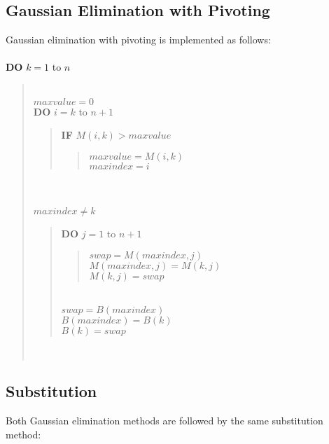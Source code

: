 \documentclass[10pt]{article}
\begin{document}
\subsection{Gaussian Elimination with Pivoting}
\noindent Gaussian elimination with pivoting is implemented as follows: \\ \\
{\bf{DO}} $k = 1$ to $n$
\begin{quote}
 \\
\noindent $maxvalue = 0$ \\
{\bf{DO}} $i = k$ to $n+1$
\begin{quote}
{\bf{IF}} $M\left(i,k\right) > maxvalue$
\begin{quote}
\noindent $maxvalue = M\left(i,k\right)$ \\
\noindent $maxindex = i$
\end{quote}
\end{quote}
 \\
 \\
 $maxindex \ne k$
\begin{quote}
{\bf{DO}} $j = 1$ to $n+1$
\begin{quote}
\noindent $swap = M\left(maxindex,j\right)$ \\
\noindent $M\left(maxindex,j\right) = M\left(k,j\right)$ \\
\noindent $M\left(k,j\right) = swap$
\end{quote}
 \\
\noindent $swap = B\left(maxindex\right)$ \\
\noindent $B\left(maxindex\right) = B\left(k\right)$ \\
\noindent $B\left(k\right) = swap$
\end{quote}
 \\
\end{quote}

\subsection{Substitution}
\noindent Both Gaussian elimination methods are followed by the same substitution method: \\
\end{document}
